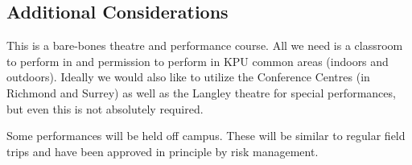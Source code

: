 \documentclass[letterpaper,10pt,headsepline]{scrreprt}
\begin{document}
\subsection{Additional Considerations}

This is a bare-bones theatre and performance course. All we need is a
classroom to perform in and permission to perform in KPU common areas
(indoors and outdoors). Ideally we would also like to utilize the
Conference Centres (in Richmond and Surrey) as well as the Langley
theatre for special performances, but even this is not absolutely
required.

Some performances will be held off campus. These will be similar to
regular field trips and have been approved in principle by risk management.
\end{document}
